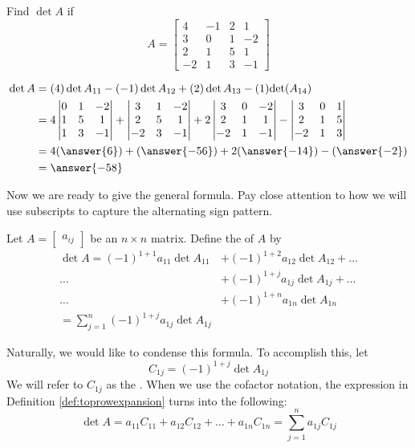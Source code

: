 \documentclass{ximera}
\begin{document}
\begin{example}\label{ex:expansiontoprow}
Find $\det{A}$ if 
$$A=\begin{bmatrix}4&-1&2&1\\3&0&1&-2\\
2&1&5&1\\-2&1&3&-1\end{bmatrix}$$
\begin{explanation}
\begin{align*}
\det{A}&=(4)\det{A_{11}}-(-1)\det{A_{12}}+(2)\det{A_{13}}-(1)\text{det}(A_{14})\\
&=4\begin{vmatrix}0&1&-2\\1&5&1\\1&3&-1\end{vmatrix}+\begin{vmatrix}3&1&-2\\2&5&1\\-2&3&-1\end{vmatrix}+2\begin{vmatrix}3&0&-2\\2&1&1\\-2&1&-1\end{vmatrix}-\begin{vmatrix}3&0&1\\2&1&5\\-2&1&3\end{vmatrix}\\&=4(\answer{6})+(\answer{-56})+2(\answer{-14})-(\answer{-2})\\
&=\answer{-58}
\end{align*}
\end{explanation}
\end{example}


Now we are ready to give the general formula. Pay close attention to how we will use subscripts to capture the alternating sign pattern.

\begin{definition}\label{def:toprowexpansion}  Let $A=\begin{bmatrix}a_{ij}\end{bmatrix}$ be an $n\times n$ matrix.  Define the  of $A$ by
\begin{align*}\det{A}=(-1)^{1+1}a_{11}\det{A_{11}}&+(-1)^{1+2}a_{12}\det{A_{12}}+\ldots \\
\ldots &+(-1)^{1+j}a_{1j}\det{A_{1j}}+\ldots \\
\ldots &+(-1)^{1+n}a_{1n}\det{A_{1n}}\\
=\sum_{j=1}^n(-1)^{1+j}a_{1j}\det{A_{1j}}
\end{align*}
\end{definition}
Naturally, we would like to condense this formula.  To accomplish this, let
$$C_{1j}=(-1)^{1+j}\det{A_{1j}}$$
We will refer to $C_{1j}$ as the .  When we use the cofactor notation, the expression in Definition \ref{def:toprowexpansion} turns into the following:
$$\det{A}=a_{11}C_{11}+a_{12}C_{12}+\ldots +a_{1n}C_{1n}=\sum_{j=1}^n a_{1j}C_{1j}$$
\end{document}
